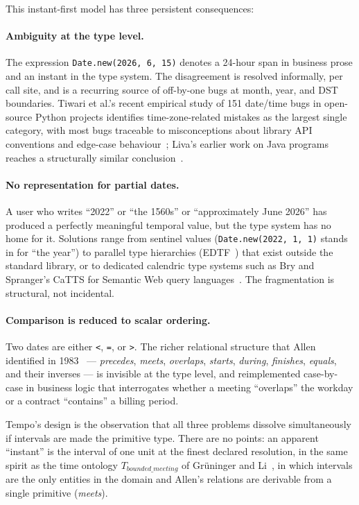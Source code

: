 This instant-first model has three persistent consequences:

\paragraph*{Ambiguity at the type level.} The expression
\texttt{Date.new(2026, 6, 15)} denotes a 24-hour span in business
prose and an instant in the type system. The disagreement is resolved
informally, per call site, and is a recurring source of off-by-one
bugs at month, year, and DST boundaries. Tiwari et al.'s recent
empirical study of 151 date/time bugs in open-source Python projects
identifies time-zone-related mistakes as the largest single category,
with most bugs traceable to misconceptions about library API
conventions and edge-case behaviour~\cite{tiwari2025time}; Liva's
earlier work on Java programs reaches a structurally similar
conclusion~\cite{liva2018}.

\paragraph*{No representation for partial dates.} A user who writes
``2022'' or ``the 1560s'' or ``approximately June 2026'' has produced
a perfectly meaningful temporal value, but the type system has no
home for it. Solutions range from sentinel values
(\texttt{Date.new(2022, 1, 1)} stands in for ``the year'') to parallel
type hierarchies (EDTF~\cite{edtf}) that exist outside the standard
library, or to dedicated calendric type systems such as Bry and
Spranger's CaTTS for Semantic Web query
languages~\cite{bry-spranger-multicalendar}. The fragmentation is
structural, not incidental.

\paragraph*{Comparison is reduced to scalar ordering.} Two dates are
either \texttt{<}, \texttt{=}, or \texttt{>}. The richer relational
structure that Allen identified in 1983~\cite{allen1983} ---
\textit{precedes}, \textit{meets}, \textit{overlaps}, \textit{starts},
\textit{during}, \textit{finishes}, \textit{equals}, and their inverses
--- is invisible at the type level, and reimplemented case-by-case in
business logic that interrogates whether a meeting ``overlaps'' the
workday or a contract ``contains'' a billing period.

Tempo's design is the observation that all three problems dissolve
simultaneously if intervals are made the primitive type. There are no
points: an apparent ``instant'' is the interval of one unit at the
finest declared resolution, in the same spirit as the time ontology
$T_{bounded\_meeting}$ of Gr\"uninger and
Li~\cite{gruninger2017allenontology}, in which intervals are the only
entities in the domain and Allen's relations are derivable from a
single primitive (\textit{meets}).


